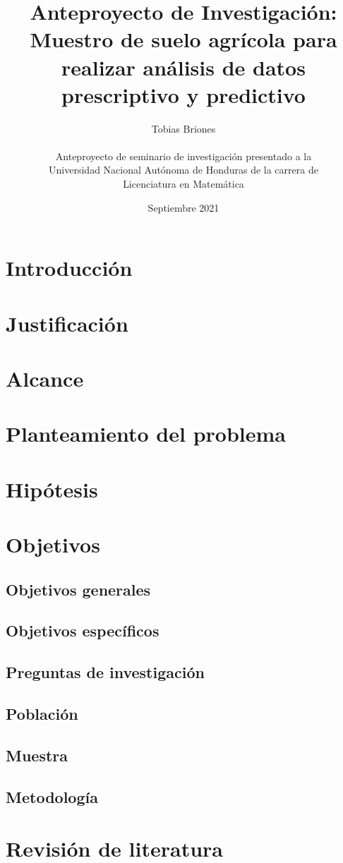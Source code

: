 \documentclass{report}
\title{Anteproyecto de Investigación: Muestro de suelo agrícola para realizar análisis de datos prescriptivo y predictivo}
\author{
Tobias Briones\\\\
Anteproyecto de seminario de investigación presentado a la\\
Universidad Nacional Autónoma de Honduras de la carrera de\\
Licenciatura en Matemática
}
\date{Septiembre 2021}
\begin{document}
\maketitle

\tableofcontents


\section{Introducción}


\section{Justificación}


\section{Alcance}

\section{Planteamiento del problema}


\section{Hipótesis}


\section{Objetivos}


\subsection{Objetivos generales}


\subsection{Objetivos específicos}



\subsection{Preguntas de investigación}


\subsection{Población}


\subsection{Muestra}


\subsection{Metodología}


\section{Revisión de literatura}
\end{document}
